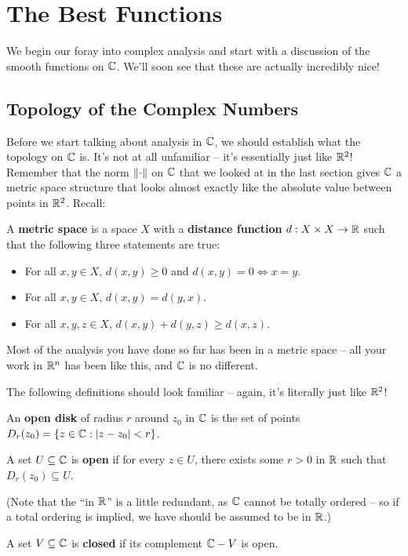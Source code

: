 \section{The Best Functions}

We begin our foray into complex analysis and start with a discussion of the smooth functions on $\mathbb C$. We'll soon see that these are actually incredibly nice!

\subsection{Topology of the Complex Numbers}
Before we start talking about analysis in $\mathbb C$, we should establish what the topology on $\mathbb C$ is. It's not at all unfamiliar -- it's essentially just like $\mathbb R^2$! Remember that the norm $\left\lVert \cdot \right\rVert$ on $\mathbb C$ that we looked at in the last section gives $\mathbb C$ a metric space structure that looks almost exactly like the absolute value between points in $\mathbb R^2$. Recall:
\begin{definition}
  A \textbf{metric space} is a space $X$ with a \textbf{distance function} $d: X \times X \to \mathbb R$ such that the following three statements are true:
  \begin{itemize}
    \item For all $x, y \in X$, $d(x,y) \geq 0$ and $d(x,y) = 0 \Leftrightarrow x = y$.
    \item For all $x, y \in X$, $d(x,y) = d(y,x)$.
    \item For all $x, y, z \in X$, $d(x,y) + d(y,z) \geq d(x,z)$.
  \end{itemize}
\end{definition}
Most of the analysis you have done so far has been in a metric space -- all your work in $\mathbb R^n$ has been like this, and $\mathbb C$ is no different.

The following definitions should look familiar -- again, it's literally just like $\mathbb R^2$!
\begin{definition}
  An \textbf{open disk} of radius $r$ around $z_0$ in $\mathbb C$ is the set of points $D_r(z_0) = \left\{ z \in \mathbb C : |z - z_0| < r \right\}$.
\end{definition}
\begin{definition}
  A set $U \subseteq \mathbb C$ is \textbf{open} if for every $z \in U$, there exists some $r > 0$ in $\mathbb R$ such that $D_r(z_0) \subseteq U$.
\end{definition}
(Note that the ``in $\mathbb R$'' is a little redundant, as $\mathbb C$ cannot be totally ordered -- so if a total ordering is implied, we have should be assumed to be in $\mathbb R$.)
\begin{definition}
  A set $V \subseteq \mathbb C$ is \textbf{closed} if its complement $\mathbb C - V$ is open.
\end{definition}

